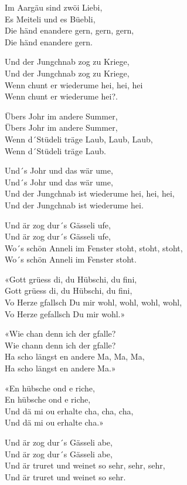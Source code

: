 \documentclass[
  letterpaper,
  a5paper]{memoir}
\begin{document}
Im Aargäu sind zwöi Liebi,\\
Es Meiteli und es Büebli,\\
Die händ enandere gern, gern, gern,\\
Die händ enandere gern.

Und der Jungchnab zog zu Kriege,\\
Und der Jungchnab zog zu Kriege,\\
Wenn chunt er wiederume hei, hei, hei\\
Wenn chunt er wiederume hei?.

Übers Johr im andere Summer,\\
Übers Johr im andere Summer,\\
Wenn d´Stüdeli träge Laub, Laub, Laub,\\
Wenn d´Stüdeli träge Laub.

Und´s Johr und das wär ume,\\
Und´s Johr und das wär ume,\\
Und der Jungchnab ist wiederume hei, hei, hei,\\
Und der Jungchnab ist wiederume hei.

Und är zog dur´s Gässeli ufe,\\
Und är zog dur´s Gässeli ufe,\\
Wo´s schön Anneli im Fenster stoht, stoht, stoht,\\
Wo´s schön Anneli im Fenster stoht.

«Gott grüess di, du Hübschi, du fini,\\
Gott grüess di, du Hübschi, du fini,\\
Vo Herze gfallsch Du mir wohl, wohl, wohl, wohl,\\
Vo Herze gefallsch Du mir wohl.»

«Wie chan denn ich der gfalle?\\
Wie chann denn ich der gfalle?\\
Ha scho längst en andere Ma, Ma, Ma,\\
Ha scho längst en andere Ma.»

«En hübsche ond e riche,\\
En hübsche ond e riche,\\
Und dä mi ou erhalte cha, cha, cha,\\
Und dä mi ou erhalte cha.»

Und är zog dur´s Gässeli abe,\\
Und är zog dur´s Gässeli abe,\\
Und är truret und weinet so sehr, sehr, sehr,\\
Und är truret und weinet so sehr.
\end{document}
